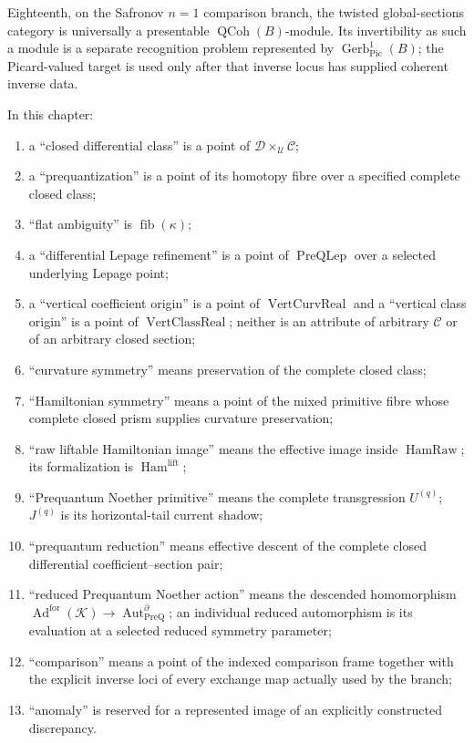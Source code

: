 Eighteenth, on the Safronov $n=1$ comparison branch, the twisted global-sections
category is universally a presentable $\operatorname{QCoh}(B)$-module.  Its
invertibility as such a module is a separate recognition problem represented by
$\operatorname{Gerb}^{1}_{\mathrm{Pic}}(B)$; the Picard-valued target is used
only after that inverse locus has supplied coherent inverse data.

\begin{convention}
\label{conv:prequantum-non-conflation}
In this chapter:
\begin{enumerate}
\item a ``closed differential class'' is a point of
      $\mathscr D\times_{\mathscr U}\mathscr C$;
\item a ``prequantization'' is a point of its homotopy fibre over a specified
      complete closed class;
\item ``flat ambiguity'' is $\operatorname{fib}(\kappa)$;
\item a ``differential Lepage refinement'' is a point of
      $\operatorname{PreQLep}$ over a selected underlying Lepage point;
\item a ``vertical coefficient origin'' is a point of
      $\operatorname{VertCurvReal}$ and a ``vertical class origin'' is a point of
      $\operatorname{VertClassReal}$; neither is an attribute of arbitrary
      $\mathscr C$ or of an arbitrary closed section;
\item ``curvature symmetry'' means preservation of the complete closed class;
\item ``Hamiltonian symmetry'' means a point of the mixed primitive fibre whose
      complete closed prism supplies curvature preservation;
\item ``raw liftable Hamiltonian image'' means the effective image inside
      $\operatorname{HamRaw}$; its formalization is
      $\operatorname{Ham}^{\mathrm{lift}}$;
\item ``Prequantum Noether primitive'' means the complete transgression $U^{(q)}$;
      $J^{(q)}$ is its horizontal-tail current shadow;
\item ``prequantum reduction'' means effective descent of the complete closed
      differential coefficient--section pair;
\item ``reduced Prequantum Noether action'' means the descended homomorphism
      $\operatorname{Ad}^{\mathrm{for}}(\mathcal K)\to
      \operatorname{Aut}^{\partial}_{\mathrm{PreQ}}$; an individual reduced
      automorphism is its evaluation at a selected reduced symmetry parameter;
\item ``comparison'' means a point of the indexed comparison frame together
      with the explicit inverse loci of every exchange map actually used by the
      branch;
\item ``anomaly'' is reserved for a represented image of an explicitly constructed
      discrepancy.
\end{enumerate}
\end{convention}

